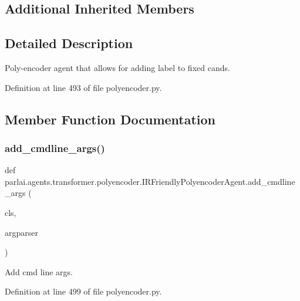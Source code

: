 \subsection*{Additional Inherited Members}


\subsection{Detailed Description}
\begin{DoxyVerb}Poly-encoder agent that allows for adding label to fixed cands.
\end{DoxyVerb}
 

Definition at line 493 of file polyencoder.\+py.



\subsection{Member Function Documentation}
\mbox{\label{classparlai_1_1agents_1_1transformer_1_1polyencoder_1_1IRFriendlyPolyencoderAgent_afbf30376e853d1a5f9a52b1ae3453aa2}} 
\subsubsection{\texorpdfstring{add\+\_\+cmdline\+\_\+args()}{add\_cmdline\_args()}}
{\footnotesize\ttfamily def parlai.\+agents.\+transformer.\+polyencoder.\+I\+R\+Friendly\+Polyencoder\+Agent.\+add\+\_\+cmdline\+\_\+args (\begin{DoxyParamCaption}\item[{}]{cls,  }\item[{}]{argparser }\end{DoxyParamCaption})}

\begin{DoxyVerb}Add cmd line args.
\end{DoxyVerb}
 

Definition at line 499 of file polyencoder.\+py.


